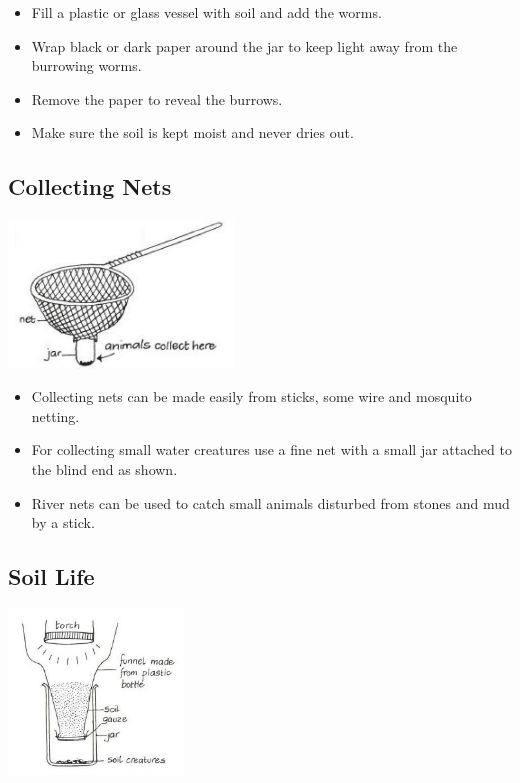 \begin{multicols}{2}
\begin{itemize}
\item Fill a plastic or glass vessel with soil and add the worms.
\item Wrap black or dark paper
around the jar to keep light
away from the burrowing
worms.
\item Remove the paper to reveal the
burrows.
\item Make sure the soil is kept moist
and never dries out.
\end{itemize}


\subsection{Collecting Nets}

\begin{center}
\includegraphics[width=0.45\textwidth]{./img/vso/nets.jpg}
\end{center}

\begin{itemize}
\item Collecting nets can be made easily from sticks, some wire and
mosquito netting.
\item For collecting small water creatures use a fine net with a small jar
attached to the blind end as shown.
\item River nets can be used to catch small animals disturbed from stones
and mud by a stick.
\end{itemize}


\subsection{Soil Life}

\begin{center}
\includegraphics[width=0.35\textwidth]{./img/vso/soil-life.jpg}
\end{center}


\end{multicols}
